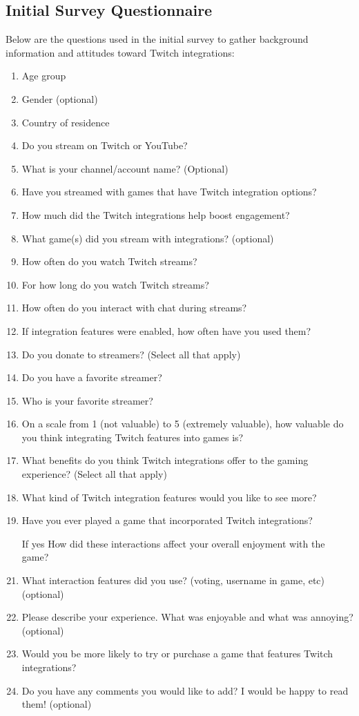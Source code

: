 \documentclass[conference]{IEEEtran}
\begin{document}
\subsection{Initial Survey Questionnaire}
Below are the questions used in the initial survey to gather background information and attitudes toward Twitch integrations:
\begin{enumerate}
    \item Age group
    \item Gender (optional)
    \item Country of residence
    \item Do you stream on Twitch or YouTube?
    \item What is your channel/account name? (Optional)
    \item Have you streamed with games that have Twitch integration options?
    \item How much did the Twitch integrations help boost engagement?
    \item What game(s) did you stream with integrations? (optional)
    \item How often do you watch Twitch streams?
    \item For how long do you watch Twitch streams?
    \item How often do you interact with chat during streams?
    \item If integration features were enabled, how often have you used them?
    \item Do you donate to streamers? (Select all that apply)
    \item Do you have a favorite streamer?
    \item Who is your favorite streamer?
    \item On a scale from 1 (not valuable) to 5 (extremely valuable), how valuable do you think integrating Twitch features into games is?
    \item What benefits do you think Twitch integrations offer to the gaming experience? (Select all that apply)
    \item What kind of Twitch integration features would you like to see more?
    \item Have you ever played a game that incorporated Twitch integrations?
    \item [If yes] How did these interactions affect your overall enjoyment with the game?
    \item What interaction features did you use? (voting, username in game, etc) (optional)
    \item Please describe your experience. What was enjoyable and what was annoying? (optional)
    \item Would you be more likely to try or purchase a game that features Twitch integrations?
    \item Do you have any comments you would like to add? I would be happy to read them! (optional)
\end{enumerate}
\end{document}
